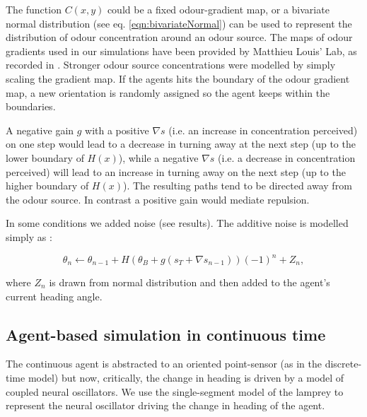 \documentclass[11pt,a4paper]{article}
\begin{document}
The function $C(x,y)$ could be a fixed odour-gradient map, or a bivariate normal distribution (see eq. \eqref{eqn:bivariateNormal}) can be used to represent the distribution of odour concentration around an odour source. 
 The maps of odour gradients used in our simulations have been provided by Matthieu Louis' Lab, as recorded in \citep{gomez2014multilevel}. Stronger odour source concentrations were modelled by simply scaling the gradient map.
If the agents hits the boundary of the odour gradient map, a new  orientation is randomly assigned so the agent keeps within the boundaries.

A negative gain $g$ with a positive $\nabla s$ (i.e. an increase in concentration perceived) on one step would lead to a decrease in turning away at the next step (up to the lower boundary of $H(x)$), while a negative $\nabla s$ (i.e. a decrease in concentration perceived) will lead to an increase in turning away  on the next step (up to the higher boundary of $H(x)$).
 The resulting paths tend to be directed away from the odour source.
 In contrast a positive gain would mediate repulsion.

In some conditions we added noise (see results). The additive noise is modelled simply as :

\begin{equation}
\theta_{n} \leftarrow \theta_{n-1} + H(\theta_B + g (s_{T} + \nabla s_{n-1})){(-1)}^n + Z_n,
\end{equation}

where $Z_n$ is drawn from normal distribution and then added to the agent's current heading angle. 
 
\subsection{Agent-based simulation in continuous time}
\label{sec:methodsCoupledOscillator}
The continuous agent is abstracted to an oriented point-sensor (as in the discrete-time model) but now, critically, the change in heading is driven by a model of coupled neural oscillators.
We use the single-segment model of the lamprey \citep{lansner1997realistic} to represent the neural oscillator driving the change in heading of the agent.

\end{document}
